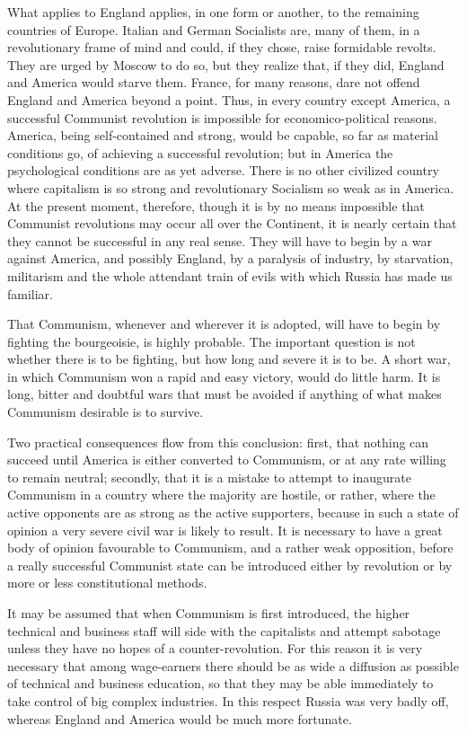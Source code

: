 What applies to England applies, in one form or another, to the remaining countries of Europe. Italian and German Socialists are, many of them, in a revolutionary frame of mind and could, if they chose, raise formidable revolts. They are urged by Moscow to do so, but they realize that, if they did, England and America would starve them. France, for many reasons, dare not offend England and America beyond a point. Thus, in every country except America, a successful Communist revolution is impossible for economico-political reasons. America, being self-contained and strong, would be capable, so far as material conditions go, of achieving a successful revolution; but in America the psychological conditions are as yet adverse. There is no other civilized country where capitalism is so strong and revolutionary Socialism so weak as in America. At the present moment, therefore, though it is by no means impossible that Communist revolutions may occur all over the Continent, it is nearly certain that they cannot be successful in any real sense. They will have to begin by a war against America, and possibly England, by a paralysis of industry, by starvation, militarism and the whole attendant train of evils with which Russia has made us familiar.

That Communism, whenever and wherever it is adopted, will have to begin by fighting the bourgeoisie, is highly probable. The important question is not whether there is to be fighting, but how long and severe it is to be. A short war, in which Communism won a rapid and easy victory, would do little harm. It is long, bitter and doubtful wars that must be avoided if anything of what makes Communism desirable is to survive.

Two practical consequences flow from this conclusion: first, that nothing can succeed until America is either converted to Communism, or at any rate willing to remain neutral; secondly, that it is a mistake to attempt to inaugurate Communism in a country where the majority are hostile, or rather, where the active opponents are as strong as the active supporters, because in such a state of opinion a very severe civil war is likely to result. It is necessary to have a great body of opinion favourable to Communism, and a rather weak opposition, before a really successful Communist state can be introduced either by revolution or by more or less constitutional methods.

It may be assumed that when Communism is first introduced, the higher technical and business staff will side with the capitalists and attempt sabotage unless they have no hopes of a counter-revolution. For this reason it is very necessary that among wage-earners there should be as wide a diffusion as possible of technical and business education, so that they may be able immediately to take control of big complex industries. In this respect Russia was very badly off, whereas England and America would be much more fortunate.

